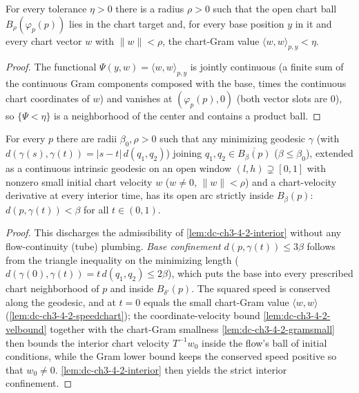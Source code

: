 \begin{lemma}
  \label{lem:dc-ch3-4-2-gramsmall}
  \leanok
  For every tolerance $\eta>0$ there is a radius $\rho>0$ such that the open chart ball
  $B_\rho(\varphi_p(p))$ lies in the chart target and, for every base position $y$ in it and every
  chart vector $w$ with $\|w\|<\rho$, the chart-Gram value $\langle w,w\rangle_{p,y}<\eta$.
\end{lemma}
\begin{proof}
  \sketch
  \leanok
  The functional $\Psi(y,w)=\langle w,w\rangle_{p,y}$ is jointly continuous (a finite sum of the
  continuous Gram components composed with the base, times the continuous chart coordinates of $w$)
  and vanishes at $(\varphi_p(p),0)$ (both vector slots are $0$), so $\{\Psi<\eta\}$ is a
  neighborhood of the center and contains a product ball.
\end{proof}

\begin{lemma}
  \label{lem:dc-ch3-4-2-interior-minimizing}
  \leanok
  For every $p$ there are radii $\beta_0,\rho>0$ such that any minimizing geodesic $\gamma$
  (with $d(\gamma(s),\gamma(t))=|s-t|\,d(q_1,q_2)$) joining $q_1,q_2\in\overline{B_\beta(p)}$
  ($\beta\le\beta_0$), extended as a continuous intrinsic geodesic on an open window
  $(l,h)\supsetneq[0,1]$ with nonzero small initial chart velocity $w$ ($w\neq0$, $\|w\|<\rho$) and a
  chart-velocity derivative at every interior time, has its open arc strictly inside $B_\beta(p)$:
  $d(p,\gamma(t))<\beta$ for all $t\in(0,1)$.
\end{lemma}
\begin{proof}
  \sketch
  \leanok
  This discharges the admissibility of \cref{lem:dc-ch3-4-2-interior} without any flow-continuity
  (tube) plumbing. \emph{Base confinement} $d(p,\gamma(t))\le3\beta$ follows from the triangle
  inequality on the minimizing length ($d(\gamma(0),\gamma(t))=t\,d(q_1,q_2)\le2\beta$), which puts
  the base into every prescribed chart neighborhood of $p$ and inside $B_{\delta'}(p)$. The squared
  speed is conserved along the geodesic, and at $t=0$ equals the small chart-Gram value
  $\langle w,w\rangle$ (\cref{lem:dc-ch3-4-2-speedchart}); the coordinate-velocity bound
  \cref{lem:dc-ch3-4-2-velbound} together with the chart-Gram smallness \cref{lem:dc-ch3-4-2-gramsmall}
  then bounds the interior chart velocity $T^{-1}w_0$ inside the flow's ball of initial conditions,
  while the Gram lower bound keeps the conserved speed positive so that $w_0\neq0$.
  \cref{lem:dc-ch3-4-2-interior} then yields the strict interior confinement.
\end{proof}

